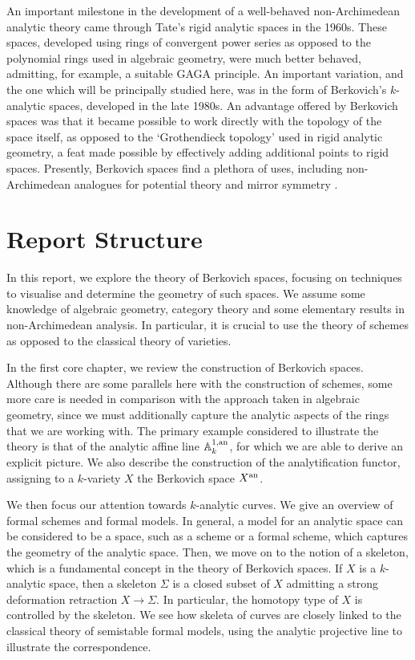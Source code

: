An important milestone in the development of a well-behaved non-Archimedean analytic theory came through Tate's rigid analytic spaces in the 1960s. 
These spaces, developed using rings of convergent power series as opposed to the polynomial rings used in algebraic geometry, were much better behaved, admitting, for example, a suitable GAGA principle. 
An important variation, and the one which will be principally studied here, was in the form of Berkovich's $k$-analytic spaces, developed in the late 1980s.
An advantage offered by Berkovich spaces was that it became possible to work directly with the topology of the space itself, as opposed to the `Grothendieck topology' used in rigid analytic geometry, a feat made possible by effectively adding additional points to rigid spaces.
Presently, Berkovich spaces find a plethora of uses, including non-Archimedean analogues for potential theory \parencite{potdynams} and mirror symmetry \parencite{kontsevich, vietnam}.

\section{Report Structure}

In this report, we explore the theory of Berkovich spaces, focusing on techniques to visualise and determine the geometry of such spaces. 
We assume some knowledge of algebraic geometry, category theory and some elementary results in non-Archimedean analysis. 
In particular, it is crucial to use the theory of schemes as opposed to the classical theory of varieties.

In the first core chapter, we review the construction of Berkovich spaces.
Although there are some parallels here with the construction of schemes, some more care is needed in comparison with the approach taken in algebraic geometry, since we must additionally capture the analytic aspects of the rings that we are working with.
The primary example considered to illustrate the theory is that of the analytic affine line $\mathbb{A}^{1, \text{an}}_{k}$, for which we are able to derive an explicit picture.
We also describe the construction of the analytification functor, assigning to a $k$-variety $X$ the Berkovich space $X^{\text{an}}$.

We then focus our attention towards $k$-analytic curves.
We give an overview of formal schemes and formal models.
In general, a model for an analytic space can be considered to be a space, such as a scheme or a formal scheme, which captures the geometry of the analytic space. 
Then, we move on to the notion of a skeleton, which is a fundamental concept in the theory of Berkovich spaces.
If $X$ is a $k$-analytic space, then a skeleton $\Sigma$ is a closed subset of $X$ admitting a strong deformation retraction $X \to \Sigma$.
In particular, the homotopy type of $X$ is controlled by the skeleton.
We see how skeleta of curves are closely linked to the classical theory of semistable formal models, using the analytic projective line to illustrate the correspondence.

